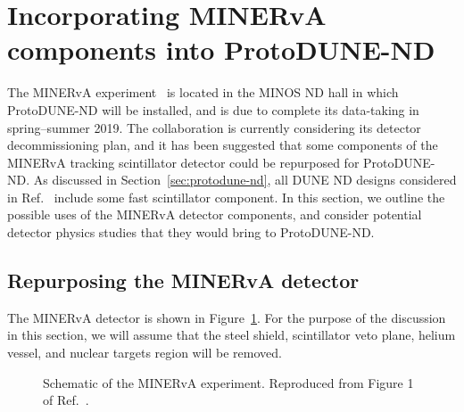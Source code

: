 \section{Incorporating MINERvA components into ProtoDUNE-ND}
\label{sec:MINERvA}
The MINERvA experiment~\cite{minerva-nim} is located in the MINOS ND hall in which ProtoDUNE-ND will be installed, and is due to complete its data-taking in spring--summer 2019. The collaboration is currently considering its detector decommissioning plan, and it has been suggested that some components of the MINERvA tracking scintillator detector could be repurposed for ProtoDUNE-ND. As discussed in Section~\ref{sec:protodune-nd}, all DUNE ND designs considered in Ref.~\cite{dune_ndcsg} include some fast scintillator component. In this section, we outline the possible uses of the MINERvA detector components, and consider potential detector physics studies that they would bring to ProtoDUNE-ND.

\subsection{Repurposing the MINERvA detector}
The MINERvA detector is shown in Figure~\ref{fig:minerva_detector}. For the purpose of the discussion in this section, we will assume that the steel shield, scintillator veto plane, helium vessel, and nuclear targets region will be removed. 
\begin{figure}[htb]
  \centering
  \caption{Schematic of the MINERvA experiment. Reproduced from Figure 1 of Ref.~\cite{minerva-nim}.}
  \label{fig:minerva_detector}
\end{figure}

